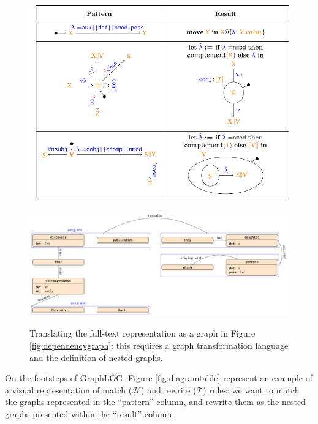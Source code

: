\begin{figure}[!pth]
	\begin{minipage}[b]{\textwidth}
		\centering
		\includegraphics[width=\textwidth]{fig/05language/diagramtable}
		\label{fig:diagramtable}
	\end{minipage}
	\begin{minipage}[b]{\textwidth}
		\centering
		\includegraphics[width=1.2\textwidth]{fig/05language/nestedrepr}
		\label{fig:nestedrepr}
	\end{minipage}
	\caption{Translating the full-text representation as a graph in Figure \ref{fig:dependencygraph}: this requires a graph transformation language and the definition of nested graphs.}
	\label{fig:globalconversiontext}
\end{figure}
	On the footsteps of GraphLOG, Figure \ref{fig:diagramtable} represent an example of a visual representation of match ($\mathcal{H}$) and rewrite ($\mathcal{T}$) rules: we want to match the graphs represented in the ``pattern'' column, and rewrite them as the nested graphs presented within the ``result'' column. 
